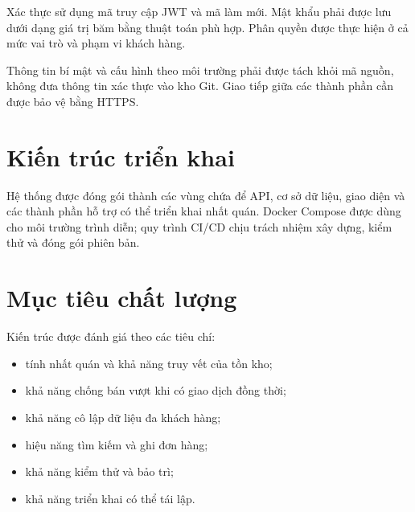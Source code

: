 Xác thực sử dụng mã truy cập JWT và mã làm mới. Mật khẩu phải được lưu dưới dạng giá trị băm
bằng thuật toán phù hợp. Phân quyền được thực hiện ở cả mức vai trò và phạm vi khách hàng.

Thông tin bí mật và cấu hình theo môi trường phải được tách khỏi mã nguồn, không đưa thông tin
xác thực vào kho Git. Giao tiếp giữa các thành phần cần được bảo vệ bằng HTTPS.

\section{Kiến trúc triển khai}

Hệ thống được đóng gói thành các vùng chứa để API, cơ sở dữ liệu, giao diện và các thành phần
hỗ trợ có thể triển khai nhất quán. Docker Compose được dùng cho môi trường trình diễn; quy
trình CI/CD chịu trách nhiệm xây dựng, kiểm thử và đóng gói phiên bản.

\section{Mục tiêu chất lượng}

Kiến trúc được đánh giá theo các tiêu chí:

\begin{itemize}
    \item tính nhất quán và khả năng truy vết của tồn kho;
    \item khả năng chống bán vượt khi có giao dịch đồng thời;
    \item khả năng cô lập dữ liệu đa khách hàng;
    \item hiệu năng tìm kiếm và ghi đơn hàng;
    \item khả năng kiểm thử và bảo trì;
    \item khả năng triển khai có thể tái lập.
\end{itemize}
